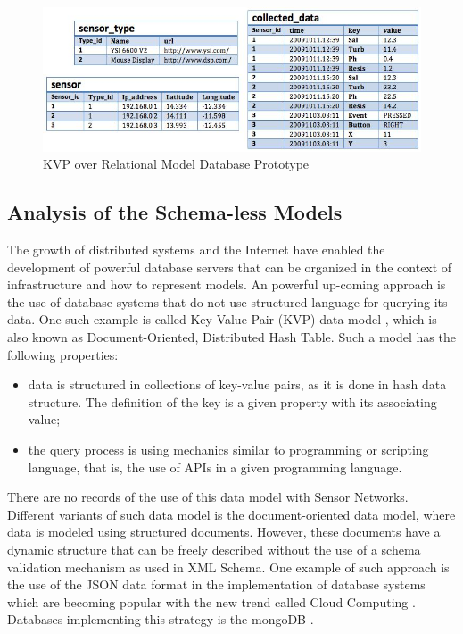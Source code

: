 \begin{figure}[!h]
  \centering
  \includegraphics[scale=0.75]{../diagrams/persistence-example-relational-kvp}
  \caption{KVP over Relational Model Database Prototype}
  \label{fig:persistence-example-relational-kvp}
\end{figure}

\subsection{Analysis of the Schema-less Models}

The growth of distributed systems and the Internet have enabled the development
of powerful database servers that can be organized in the context of
infrastructure and how to represent models. An powerful up-coming approach is
the use of database systems that do not use structured language for querying
its data. One such example is called Key-Value Pair (KVP) data model
\cite{db-kvp}, which is also known as Document-Oriented, Distributed Hash
Table. Such a model has the following properties:

\begin{itemize}
  \item data is structured in collections of key-value pairs, as it is done in
  hash data structure. The definition of the key is a given property with its
  associating value;
  \item the query process is using mechanics similar to programming or
  scripting language, that is, the use of APIs in a given programming language.
\end{itemize}

There are no records of the use of this data model with Sensor Networks.
Different variants of such data model is the document-oriented data model,
where data is modeled using structured documents. However, these documents
have a dynamic structure that can be freely described without the use of a
schema validation mechanism as used in XML Schema. One example of such
approach is the use of the JSON data format \cite{json} in the implementation
of database systems which are becoming popular with the new trend called Cloud
Computing \cite{cloud-comp-architectures}. Databases implementing this
strategy is the mongoDB .

